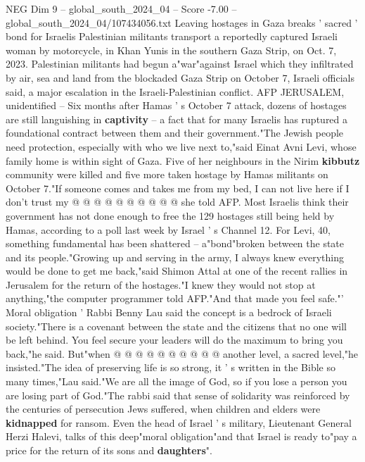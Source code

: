 \begin{textsample}{NEG Dim 9 – global\_south\_2024\_04 – Score -7.00 – global\_south\_2024\_04/107434056.txt}  \label{ex:f9_neg_322}
Leaving hostages in Gaza breaks ' sacred ' bond for Israelis Palestinian militants transport a reportedly captured Israeli woman by motorcycle, in Khan Yunis in the southern Gaza Strip, on Oct. 7, 2023.
Palestinian militants had begun a"war"against Israel which they infiltrated by air, sea and land from the blockaded Gaza Strip on October 7, Israeli officials said, a major escalation in the Israeli-Palestinian conflict.
AFP JERUSALEM, unidentified -- Six months after Hamas ' s October 7 attack, dozens of hostages are still languishing in \textbf{captivity} -- a fact that for many Israelis has ruptured a foundational contract between them and their government."The Jewish people need protection, especially with who we live next to,"said Einat Avni Levi, whose family home is within sight of Gaza.
Five of her neighbours in the Nirim \textbf{kibbutz} community were killed and five more taken hostage by Hamas militants on October 7."If someone comes and takes me from my bed, I can not live here if I don't trust my @ @ @ @ @ @ @ @ @ @ she told AFP.
Most Israelis think their government has not done enough to free the 129 hostages still being held by Hamas, according to a poll last week by Israel ' s Channel 12.
For Levi, 40, something fundamental has been shattered -- a"bond"broken between the state and its people."Growing up and serving in the army, I always knew everything would be done to get me back,"said Shimon Attal at one of the recent rallies in Jerusalem for the return of the hostages."I knew they would not stop at anything,"the computer programmer told AFP."And that made you feel safe."' Moral obligation ' Rabbi Benny Lau said the concept is a bedrock of Israeli society."There is a covenant between the state and the citizens that no one will be left behind.
You feel secure your leaders will do the maximum to bring you back,"he said.
But"when @ @ @ @ @ @ @ @ @ @ another level, a sacred level,"he insisted."The idea of preserving life is so strong, it ' s written in the Bible so many times,"Lau said."We are all the image of God, so if you lose a person you are losing part of God."The rabbi said that sense of solidarity was reinforced by the centuries of persecution Jews suffered, when children and elders were \textbf{kidnapped} for ransom.
Even the head of Israel ' s military, Lieutenant General Herzi Halevi, talks of this deep"moral obligation"and that Israel is ready to"pay a price for the return of its sons and \textbf{daughters}".

\end{textsample}
